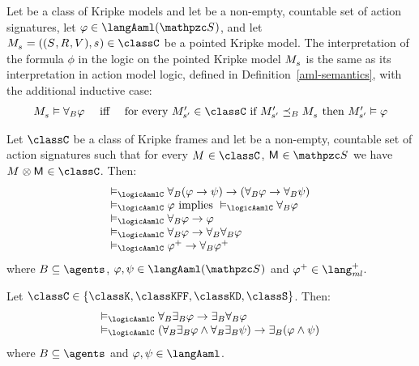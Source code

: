 \begin{definition}
Let \classC{} be a class of Kripke models and let \aSignatureFamily{} be a non-empty, countable set of action signatures, let $\phi \in \langAaml(\aSignatureFamily)$, and let $\kPModelAndTuple{\kStateS} \in \classC$ be a pointed Kripke model.
The interpretation of the formula $\phi$ in the logic \logicAamlC{} on the pointed Kripke model $\kPModel{\kStateS}$ is the same as its interpretation in action model logic, defined in Definition~\ref{aml-semantics}, with the additional inductive case:
$$
\begin{array}{lcl}
    \kPModel{\kStateS} \entails \allactsBs \phi & \text{ iff } & \text{for every } \kPModelP{\kStateSP} \in \classC \text{ if } \kPModelP{\kStateSP} \refinesBs \kPModel{\kStateS} \text{ then } \kPModelP{\kStateSP} \entails \phi
\end{array}
$$
\end{definition}

\begin{proposition}\label{aaml-validities}
Let $\classC$ be a class of Kripke frames and let \aSignatureFamily{} be a non-empty, countable set of action signatures such that for every $\kModel \in \classC$, $\aModel \in \aSignatureFamily$ we have $\kModel \exec \aModel \in \classC$. Then:
$$
\begin{array}{l}
    \entails_\logicAamlC \allrefsBs (\phi \implies \psi) \implies (\allrefsBs \phi \implies \allrefsBs \psi)\\
    \entails_\logicAamlC \phi \text{ implies } \entails_\logicAamlC \allrefsBs \phi\\
    \entails_\logicAamlC \allrefsBs \phi \implies \phi\\
    \entails_\logicAamlC \allrefsBs \phi \implies \allrefsBs \allrefsBs \phi\\
    \entails_\logicAamlC \phi^+ \implies \allrefsBs \phi^+
\end{array}
$$
where $\agentsB \subseteq \agents$, $\phi, \psi \in \langAaml(\aSignatureFamily)$ and $\phi^+ \in \langMlPlus$.
\end{proposition}

\begin{proposition}\label{aaml-mckinsey}
Let $\classC \in \{\classK, \classKFF, \classKD, \classS\}$. Then:
$$
\begin{array}{l}
    \entails_\logicAamlC \allrefsBs \somerefsBs \phi \implies \somerefsBs \allrefsBs \phi\\
    \entails_\logicAamlC (\allrefsBs \somerefsBs \phi \land \allrefsBs \somerefsBs \psi) \implies \somerefsBs (\phi \land \psi)
\end{array}
$$
where $\agentsB \subseteq \agents$ and $\phi, \psi \in \langAaml$.
\end{proposition}

